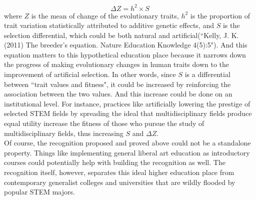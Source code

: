 \documentclass[12pt]{article}
\newcommand\tab[1][1cm]{\hspace*{#1}}
\begin{document}
\begin{equation}
\Delta Z = h^2 \times S
\end{equation}
where $Z$ is the mean of change of the evolutionary traits, $h^2$ is the proportion of trait variation statistically attributed to additive genetic effects, and $S$ is the selection differential, which could be both natural and artificial(``Kelly, J. K. (2011) The breeder's equation. Nature Education Knowledge 4(5):5"). And this equation matters to this hypothetical education place because it narrows down the progress of making evolutionary changes in human traits down to the improvement of artificial selection. In other words, since $S$ is a differential between ``trait values and fitness", it could be increased by reinforcing the association between the two values. And this increase could be done on an institutional level. For instance, practices like artificially lowering the prestige of selected STEM fields by spreading the ideal that multidisciplinary fields produce equal utility increase the fitness of those who pursue the study of multidisciplinary fields, thus increasing $S$ and $\Delta Z$. \\
\tab Of course, the recognition proposed and proved above could not be a standalone property. Things like implementing general liberal art education as introductory courses could potentially help with building the recognition as well. The recognition itself, however, separates this ideal higher education place from contemporary generalist colleges and universities that are wildly flooded by popular STEM majors. 


\pagebreak
\end{document}
